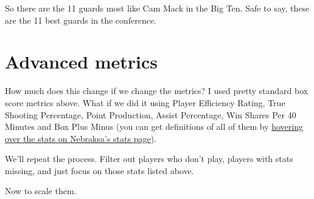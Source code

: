 \documentclass[]{book}
\newenvironment{Shaded}{\begin{snugshade}}{\end{snugshade}}
\newcommand{\DataTypeTok}[1]{\textcolor[rgb]{0.13,0.29,0.53}{#1}}
\newcommand{\DecValTok}[1]{\textcolor[rgb]{0.00,0.00,0.81}{#1}}
\newcommand{\KeywordTok}[1]{\textcolor[rgb]{0.13,0.29,0.53}{\textbf{#1}}}
\newcommand{\NormalTok}[1]{#1}
\newcommand{\OperatorTok}[1]{\textcolor[rgb]{0.81,0.36,0.00}{\textbf{#1}}}
\newcommand{\StringTok}[1]{\textcolor[rgb]{0.31,0.60,0.02}{#1}}
\begin{document}
So there are the 11 guards most like Cam Mack in the Big Ten. Safe to say, these are the 11 best guards in the conference.

\hypertarget{advanced-metrics}{%
\section{Advanced metrics}\label{advanced-metrics}}

How much does this change if we change the metrics? I used pretty standard box score metrics above. What if we did it using Player Efficiency Rating, True Shooting Percentage, Point Production, Assist Percentage, Win Shares Per 40 Minutes and Box Plus Minus (you can get definitions of all of them by \href{https://www.sports-reference.com/cbb/schools/nebraska/2020.html}{hovering over the stats on Nebraksa's stats page}).

We'll repeat the process. Filter out players who don't play, players with stats missing, and just focus on those stats listed above.

\begin{Shaded}
\end{Shaded}

Now to scale them.

\begin{Shaded}
\end{Shaded}
\end{document}
